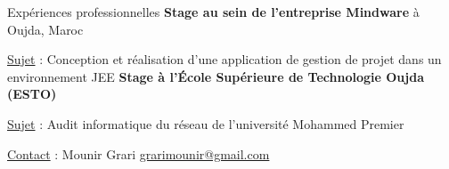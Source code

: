 \begin{rubric}{Expériences professionnelles}
%
%
	\textbf{Stage au sein de l’entreprise Mindware} à Oujda, Maroc
     \hfill{} 
    \par \underline{Sujet} : {Conception et réalisation d'une application de gestion de projet dans un environnement JEE}
%
    \textbf{Stage à l’École Supérieure de Technologie Oujda (ESTO)}
     \hfill{} 
    \par \underline{Sujet} : {Audit informatique du réseau de l'université Mohammed Premier}
	\par \underline{Contact} : Mounir Grari \href{mailto:grarimounir@gmail.com}{grarimounir@gmail.com}
%
%
%
\end{rubric}
